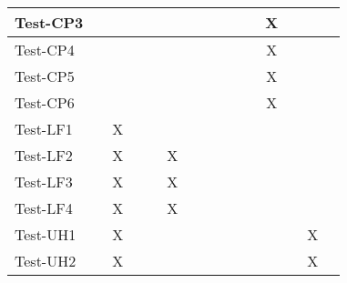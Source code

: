 \documentclass[12pt, titlepage]{article}
\begin{document}
\begin{table}[H]
\begin{adjustwidth}{-0.3in}{-0.5in}
{\begin{tabular}{c|c|c|c|c|c|c|c|c|c|c|c|c|c|c|}
\multicolumn{1}{|l|}{{Test-CP3}}   &             &             &             &             &             &             &            &             &              &             &       X       &             &  &                    \\ \hline
\multicolumn{1}{|l|}{{Test-CP4}}   &             &             &             &             &             &             &            &             &              &             &       X       &             &  &                    \\ \hline
\multicolumn{1}{|l|}{{Test-CP5}}   &             &             &             &             &             &             &            &             &              &             &       X       &             &  &                    \\ \hline
\multicolumn{1}{|l|}{{Test-CP6}}   &             &             &             &             &             &             &            &             &              &             &       X       &             &  &                    \\ \hline
\multicolumn{1}{|l|}{{Test-LF1}}   &             &         X    &             &             &             &             &             &             &              &              &              &             &  &                    \\ \hline
\multicolumn{1}{|l|}{{Test-LF2}}   &             &        X     &             &             &     X        &             &             &             &              &              &              &             &  &                    \\ \hline
\multicolumn{1}{|l|}{{Test-LF3}}   &             &           X  &             &             &    X         &             &             &             &              &              &              &             &  &                    \\ \hline
\multicolumn{1}{|l|}{{Test-LF4}}   &             &         X    &             &             &     X        &             &             &             &              &              &              &             &  &                    \\ \hline
\multicolumn{1}{|l|}{{Test-UH1}}   &             &        X     &             &             &             &             &             &             &              &              &              &              & X &                    \\ \hline
\multicolumn{1}{|l|}{{Test-UH2}}   &             &       X      &             &             &             &             &             &             &              &              &              &             & X &                    \\ \hline

\end{tabular}}
\end{adjustwidth}
\end{table}
\end{document}
